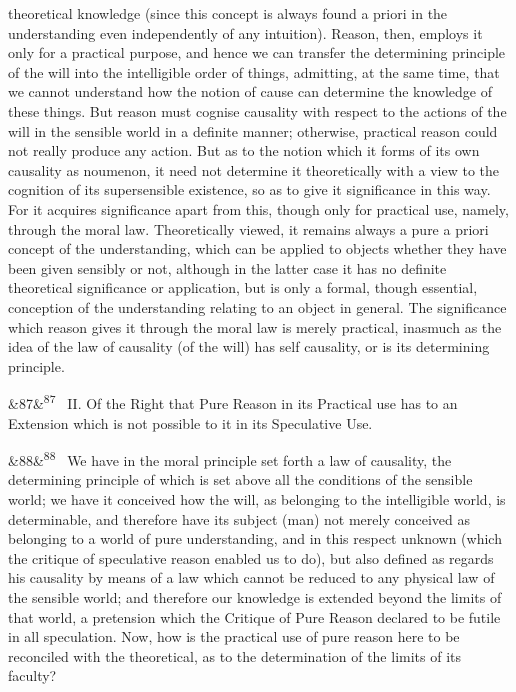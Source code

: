 \documentclass[12pt]{article}
\newcommand{\para}[1][]{\par\noindent\ifx&#1&\else\textsuperscript{\footnotesize #1}~\fi}
\begin{document}
theoretical knowledge (since this concept is always found a priori in the understanding even independently of any intuition). Reason, then, employs it only for a practical purpose, and hence we can transfer the determining principle of the will into the intelligible order of things, admitting, at the same time, that we cannot understand how the notion of cause can determine the knowledge of these things. But reason must cognise causality with respect to the actions of the will in the sensible world in a definite manner; otherwise, practical reason could not really produce any action. But as to the notion which it forms of its own causality as noumenon, it need not determine it theoretically with a view to the cognition of its supersensible existence, so as to give it significance in this way. For it acquires significance apart from this, though only for practical use, namely, through the moral law. Theoretically viewed, it remains always a pure a priori concept of the understanding, which can be applied to objects whether they have been given sensibly or not, although in the latter case it has no definite theoretical significance or application, but is only a formal, though essential, conception of the understanding relating to an object in general. The significance which reason gives it through the moral law is merely practical, inasmuch as the idea of the law of causality (of the will) has self causality, or is its determining principle.

\para[87] II. Of the Right that Pure Reason in its Practical use has to an Extension which is not possible to it in its Speculative Use.

\para[88] We have in the moral principle set forth a law of causality, the determining principle of which is set above all the conditions of the sensible world; we have it conceived how the will, as belonging to the intelligible world, is determinable, and therefore have its subject (man) not merely conceived as belonging to a world of pure understanding, and in this respect unknown (which the critique of speculative reason enabled us to do), but also defined as regards his causality by means of a law which cannot be reduced to any physical law of the sensible world; and therefore our knowledge is extended beyond the limits of that world, a pretension which the Critique of Pure Reason declared to be futile in all speculation. Now, how is the practical use of pure reason here to be reconciled with the theoretical, as to the determination of the limits of its faculty?
\end{document}
